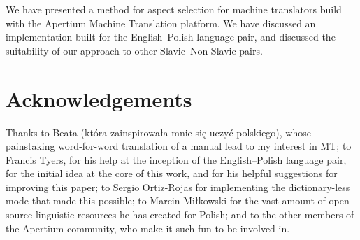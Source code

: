 \documentclass[11pt]{article}
\begin{document}
We have presented a method for aspect selection for machine translators
build with the Apertium Machine Translation platform. We have discussed
an implementation built for the English--Polish language pair, and
discussed the suitability of our approach to other Slavic--Non-Slavic 
pairs.

\section{Acknowledgements}

Thanks to Beata (kt\'{o}ra zainspirowa\l{}a mnie si\k{e} uczy\'{c} polskiego),
whose painstaking word-for-word translation of a manual lead to my 
interest in MT; to Francis Tyers, for his help at the inception of the
English--Polish language pair, for the initial idea at the core of this work,
and for his helpful suggestions for improving this paper; to Sergio Ortiz-Rojas for implementing the
dictionary-less mode that made this possible; to Marcin Mi\l{}kowski for
the vast amount of open-source linguistic resources he has created for Polish;
and to the other members of the Apertium
community, who make it such fun to be involved in.



\end{document}
